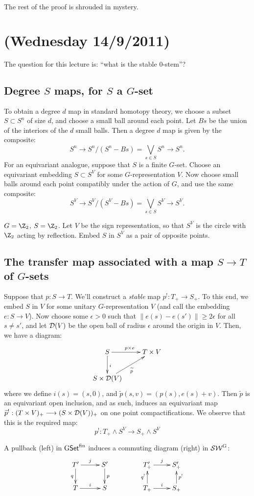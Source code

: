 \documentclass[11pt]{article}
\newcommand{\NewLecture}[3]{\section{#1 {\small(#2/#3/2011)}}}
\begin{document}
\begin{FirstNineLectures}
The rest of the proof is shrouded in mystery.

\NewLecture{}{Wednesday 14}{9}
The question for this lecture is: ``what is the stable $0$-stem''?
\subsection*{Degree $S$ maps, for $S$ a $G$-set}
To obtain a degree $d$ map in standard homotopy theory, we choose a subset $S\subset S^n$ of size $d$, and choose a small ball around each point. Let $Bs$ be the union of the interiors of the $d$ small balls. Then a degree $d$ map is given by the composite:
\[S^n\to S^n/(S^n-Bs)=\textstyle{\bigvee}_{\!s\in S}S^n\to S^n.\]
For an equivariant analogue, suppose that $S$ is a finite $G$-set. Choose an equivariant embedding $S\subset S^V$ for some $G$-representation $V$. Now choose small balls around each point compatibly under the action of $G$, and use the same composite: 
\[S^V\to S^V/(S^V-Bs)=\textstyle{\bigvee}_{\!s\in S}S^V\to S^V.\]
\begin{exmp*}
$G=\Z_2$, $S=\Z_2$. Let $V$ be the sign representation, so that $S^V$ is the circle with $\Z_2$ acting by reflection. Embed $S$ in $S^V$ as a pair of opposite points.
\end{exmp*}
\subsection*{The transfer map associated with a map $S\to T$ of $G$-sets}
Suppose that $p:S\to T$. We'll construct a \emph{stable} map $p^!:T_+\to S_+$.  To this end, we embed $S$ in $V$ for some unitary $G$-representation $V$ (and call the embedding $e:S\to V$). Now choose some $\epsilon>0$ such that $\|e(s)-e(s')\|\geq 2\epsilon$ for all $s\neq s'$, and let $\mathcal{D}(V)$ be the open ball of radius $\epsilon$ around the origin in $V$. Then, we have a diagram:
\[\xymatrix{
S\ar[d]^i\ar[r]^{p\times e}&T\times V\\
S\times \calD(V)\ar[ur]_{\widetilde p}
}\]
where we define $i(s)=(s,0)$, and $\widetilde p(s,v)=(p(s),e(s)+v)$. Then $\widetilde p$ is an equivariant open inclusion, and as such, induces an equivariant map $\widetilde p^!:(T\times V)_+\longrightarrow (S\times \mathcal{D}(V))_+$ on one point compactifications. We observe that this is the required map:
\[p^!:T_+\wedge S^V\to S_+\wedge S^V\]
\begin{prop*}
A pullback (left) in $\operatorname{{G\mathsf{Set}^\textup{fin}}}$ induces a commuting diagram (right) in $\operatorname{{\mathcal{SW}^G}}$:
\[\xymatrix@!0@R=12mm@C=1.5cm{
\ar[d]_qT'\ar[r]^j&S'\ar[d]^p\\
T\ar[r]^i&S
}\qquad\qquad\xymatrix@!0@R=12mm@C=1.5cm{
\ar[d];[]^{q^!}T'_+\ar[r]^j&S'_+\ar[d];[]_{p^!}\\
T_+\ar[r]^i&S_+
}\]
\end{prop*}

\end{FirstNineLectures}
\end{document}
